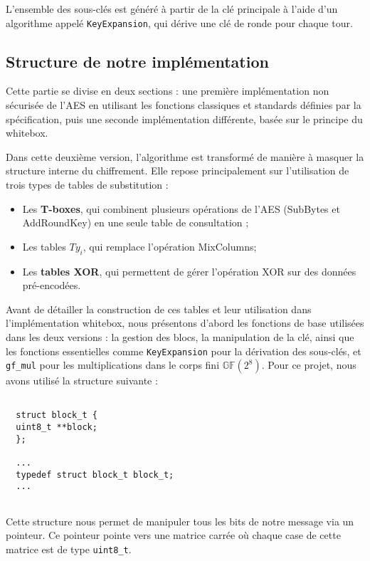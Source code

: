 \documentclass[a4paper, 10pt]{article}
\begin{document}
L’ensemble des sous-clés est généré à partir de la clé principale à l’aide d’un algorithme appelé \texttt{KeyExpansion}, 
qui dérive une clé de ronde pour chaque tour.

\subsection{Structure de notre implémentation}

Cette partie se divise en deux sections : une première implémentation non sécurisée de l’AES en utilisant les fonctions 
classiques et standards définies par la spécification, puis une seconde implémentation différente, basée sur le principe 
du whitebox.

Dans cette deuxième version, l’algorithme est transformé de manière à masquer la structure interne du chiffrement. Elle 
repose principalement sur l’utilisation de trois types de tables de substitution :

\begin{itemize}
  \item Les \textbf{T-boxes}, qui combinent plusieurs opérations de l’AES (SubBytes et AddRoundKey) en une seule table de consultation ;
  \item Les tables $Ty_{i}$, qui remplace l'opération MixColumns;
  \item Les \textbf{tables XOR}, qui permettent de gérer l'opération XOR sur des données pré-encodées.
\end{itemize}

Avant de détailler la construction de ces tables et leur utilisation dans l'implémentation whitebox, nous présentons 
d’abord les fonctions de base utilisées dans les deux versions : la gestion des blocs, la manipulation de la clé, 
ainsi que les fonctions essentielles comme \texttt{KeyExpansion} pour la dérivation des sous-clés, et \texttt{gf\_mul} 
pour les multiplications dans le corps fini $\mathbb{GF}(2^8)$.
  Pour ce projet, nous avons utilisé la structure suivante :


  \small{
  \begin{verbatim}
  
  struct block_t {
  uint8_t **block;
  };
  
  ...
  typedef struct block_t block_t;
  ...
  
  \end{verbatim}
  }
  \normalsize
  Cette structure nous permet de manipuler tous les bits de notre message via un pointeur.
  Ce pointeur pointe vers une matrice carrée où chaque case de cette matrice est de type \texttt{uint8\_t}.
\end{document}
